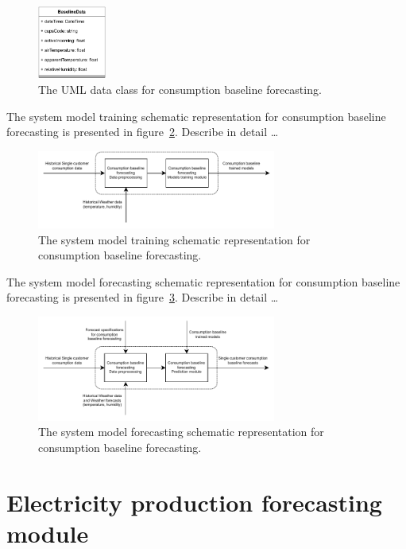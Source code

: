 \begin{figure}[H]
\centering
\includegraphics[width=0.20\textwidth]{images/baseline_uml}
\caption{The UML data class for consumption baseline forecasting.}
\label{fig:umlbaseline}
\end{figure}

The system model training schematic representation for consumption baseline forecasting is presented in figure~\ref{fig:modeltrainingbaseline}.
Describe in detail …

\begin{figure}[H]
\centering
\includegraphics[width=0.7\textwidth]{images/system_model_training_baseline}
\caption{The system model training schematic representation for consumption baseline forecasting.}
\label{fig:modeltrainingbaseline}
\end{figure}

The system model forecasting schematic representation for consumption baseline forecasting is presented in figure~\ref{fig:modelforecastingbaseline}.
Describe in detail …

\begin{figure}[H]
\centering
\includegraphics[width=0.7\textwidth]{images/system_model_forecasting_baseline}
\caption{The system model forecasting schematic representation for consumption baseline forecasting.}
\label{fig:modelforecastingbaseline}
\end{figure}


\section{Electricity production forecasting module}
\label{sec:productionmodel}
\vspace{0.2 cm}

